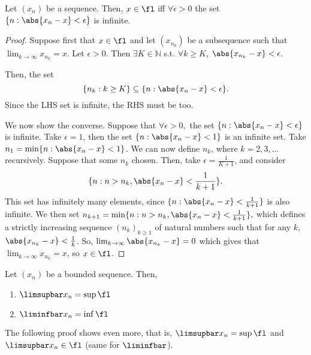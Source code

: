 \documentclass[12pt]{article}
\begin{document}
\begin{proposition}\label{prop:limitpointinifinite}
  Let $(x_n)$ be a sequence. Then, $x \in \fl$ iff $\forall \epsilon > 0$ the set $\{n : \abs{x_n - x} < \epsilon\}$ is infinite.
\end{proposition}

\begin{proof}
  Suppose first that $x \in \fl$ and let $(x_{n_k})$ be a subsequence such that $\lim_{k\to\infty} x_{n_k} = x$. Let $\epsilon > 0$. Then $\exists K \in \mathbb{N}$ s.t. $\forall k \geq K$, $\abs{x_{n_k} - x} < \epsilon$.

  Then, the set \[
  \{n_k : k \geq K\}   \subseteq \{n : \abs{x_n - x} < \epsilon\}.
  \]
  Since the LHS set is infinite, the RHS must be too.

  We now show the converse. Suppose that $\forall \epsilon > 0,$ the set $\{n : \abs{x_{n} - x} < \epsilon\}$ is infinite. %
  Take $\epsilon = 1$, then the set $\{n : \abs{x_n - x} < 1\}$ is an infinite set. Take $n_1 = \min \{n : \abs{x_n - x} < 1\}$. We can now define $n_k$, where $k = 2,3,\dots$ recursively. Suppose that some $n_k$ chosen. Then, take $\epsilon = \frac{1}{K+1}$, and consider \[
  \{n : n > n_k, \abs{x_n - x} < \frac{1}{k+1}\}.  
  \]
  This set has infinitely many elements, since $\{n : \abs{x_n - x} < \frac{1}{k+1}\}$ is also infinite. %
  We then set $n_{k+1} = \min \{n : n > n_k, \abs{x_n - x} < \frac{1}{k+1}\},$ which defines a strictly increasing sequence $(n_k)_{k \geq 1}$ of natural numbers such that for any $k$, $\abs{x_{n_k} - x} < \frac{1}{k}$. So, $\lim_{k\to\infty} \abs{x_{n_k} - x} = 0$ which gives that $\lim_{k\to\infty} x_{n_k} = x$, so $x \in \fl$.
\end{proof}

\begin{theorem}\label{thm:limsupliminflimitpoints}
  Let $(x_n)$ be a bounded sequence. Then, \begin{enumerate}
    \item $\limsupbar x_n = \sup \fl$
    \item $\liminfbar x_n = \inf \fl$
  \end{enumerate}
\end{theorem}

\begin{remark}
  The following proof shows even more, that is, $\limsupbar x_n = \sup \fl$ and $\limsupbar x_n \in \fl$ (same for $\liminfbar$).
\end{remark}
\end{document}
